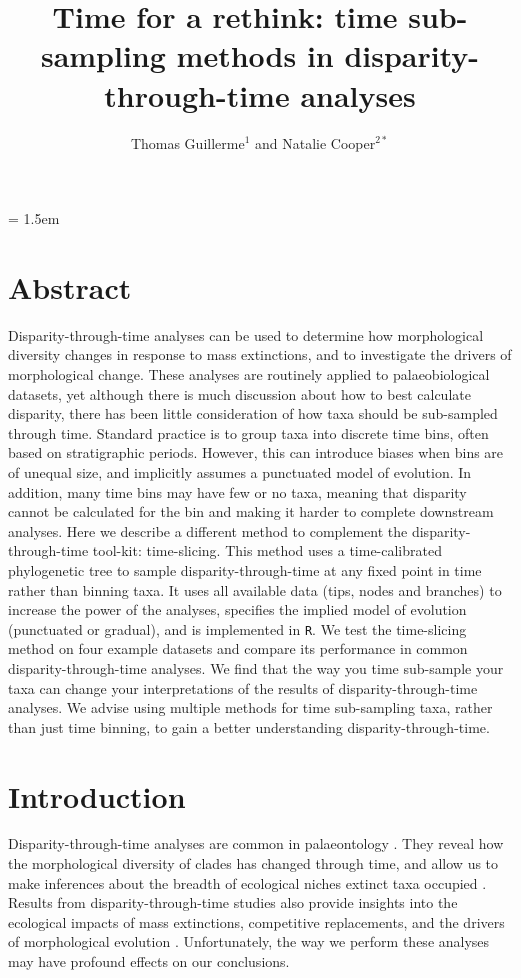 \documentclass[12pt,a4paper]{article}
\title{Time for a rethink: time sub-sampling methods in disparity-through-time analyses}
\author{
	Thomas Guillerme$^{1}$ and Natalie Cooper$^{2*}$
}
\date{}
\affiliation{\noindent{\footnotesize
	$^1$School of Biological Sciences, University of Queensland, St. Lucia, Queensland, Australia.\\
	$^2$Department of Life Sciences, Natural History Museum, Cromwell Road, London, SW7 5BD, UK. natalie.cooper@nhm.ac.uk}\\
	$^*$Corresponding author\\}
\begin{document}
\mstitlepage
\parindent = 1.5em
\addtolength{\parskip}{.3em}

\section{Abstract}

Disparity-through-time analyses can be used to determine how morphological diversity changes in response to mass extinctions, and to investigate the drivers of morphological change.
These analyses are routinely applied to palaeobiological datasets, yet although there is much discussion about how to best calculate disparity, there has been little consideration of how taxa should be sub-sampled through time.
Standard practice is to group taxa into discrete time bins, often based on stratigraphic periods. 
However, this can introduce biases when bins are of unequal size, and implicitly assumes a punctuated model of evolution. 
In addition, many time bins may have few or no taxa, meaning that disparity cannot be calculated for the bin and making it harder to complete downstream analyses.
Here we describe a different method to complement the disparity-through-time tool-kit: time-slicing.
This method uses a time-calibrated phylogenetic tree to sample disparity-through-time at any fixed point in time rather than binning taxa.
It uses all available data (tips, nodes and branches) to increase the power of the analyses, specifies the implied model of evolution (punctuated or gradual), and is implemented in \texttt{R}.
We test the time-slicing method on four example datasets and compare its performance in common disparity-through-time analyses.
We find that the way you time sub-sample your taxa can change your interpretations of the results of disparity-through-time analyses.
We advise using multiple methods for time sub-sampling taxa, rather than just time binning, to gain a better understanding disparity-through-time.

\newpage
\raggedright
\doublespacing
\setlength{\parindent}{1cm}

\section{Introduction}
Disparity-through-time analyses are common in palaeontology \citep{gould1991disparity,briggs1992morphological,Wills1994,Foote01071994}.
They reveal how the morphological diversity of clades has changed through time, and allow us to make inferences about the breadth of ecological niches extinct taxa occupied \citep{foote1997evolution}.
Results from disparity-through-time studies also provide insights into the ecological impacts of mass extinctions, competitive replacements, and the drivers of morphological evolution \citep{Brusatte12092008,Foote29111996,friedmanexplosive2010}.
Unfortunately, the way we perform these analyses may have profound effects on our conclusions.
\end{document}
